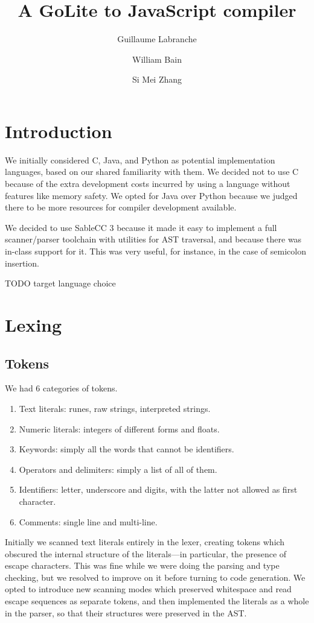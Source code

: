 \documentclass[oneside]{article}
\begin{document}
\title{A GoLite to JavaScript compiler}
\author{Guillaume Labranche \and William Bain \and Si Mei Zhang}
\maketitle

\tableofcontents

\section{Introduction}

We initially considered C, Java, and Python as potential implementation languages, based on our shared familiarity with them. We decided not to use C because of the extra development costs incurred by using a language without features like memory safety. We opted for Java over Python because we judged there to be more resources for compiler development available.

We decided to use SableCC 3 because it made it easy to implement a full scanner/parser toolchain with utilities for AST traversal, and because there was in-class support for it. This was very useful, for instance, in the case of semicolon insertion.

TODO target language choice

\section{Lexing}

\subsection{Tokens}
We had 6 categories of tokens.
\begin{enumerate}
\item Text literals: runes, raw strings, interpreted strings.
\item Numeric literals: integers of different forms and floats.
\item Keywords: simply all the words that cannot be identifiers.
\item Operators and delimiters: simply a list of all of them.
\item Identifiers: letter, underscore and digits, with the latter not allowed as first character.
\item Comments: single line and multi-line.
\end{enumerate}

Initially we scanned text literals entirely in the lexer, creating tokens which obscured the internal structure of the literals---in particular, the presence of escape characters. This was fine while we were doing the parsing and type checking, but we resolved to improve on it before turning to code generation. We opted to introduce new scanning modes which preserved whitespace and read escape sequences as separate tokens, and then implemented the literals as a whole in the parser, so that their structures were preserved in the AST.
\end{document}
